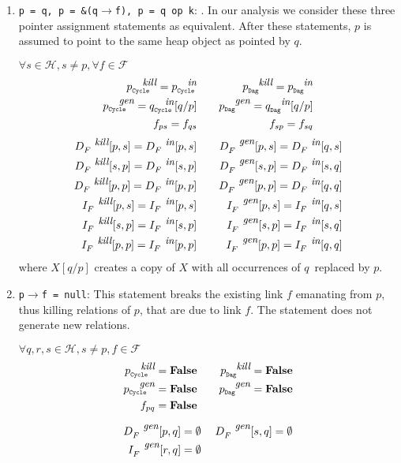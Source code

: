 \documentclass[runningheads,a4paper]{llncs}
\newcommand{\p}{\ensuremath{p}}
\newcommand{\q}{\ensuremath{q}}
\newcommand{\s}{\ensuremath{s}}
\newcommand{\myr}{\ensuremath{r}}
\newcommand{\heap}{\ensuremath{\mathcal{H}}}
\newcommand{\fields}{\ensuremath{\mathcal{F}}}
\newcommand{\subC}{\mbox{\scalebox{.6}{\Cycle}}}
\newcommand{\subD}{\mbox{\scalebox{.6}{\Dag}}}
\newcommand{\din}{\mbox{\footnotesize\em in}}
\newcommand{\dkill}{\mbox{\footnotesize\em kill}}
\newcommand{\dgen}{\mbox{\footnotesize\em gen}}
\newcommand{\GenC}[1]{\ensuremath{{#1}_{\subC}^{\dgen}}}
\newcommand{\GenD}[1]{\ensuremath{{#1}_{\subD}^{\dgen}}}
\newcommand{\KillC}[1]{\ensuremath{{#1}_{\subC}^{\dkill}}}
\newcommand{\KillD}[1]{\ensuremath{{#1}_{\subD}^{\dkill}}}
\newcommand{\InC}[1]{\ensuremath{{#1}_{\subC}^{\din}}}
\newcommand{\InD}[1]{\ensuremath{{#1}_{\subD}^{\din}}}
\newcommand{\Dag}{{\tt Dag}}
\newcommand{\Cycle}{{\tt Cycle}}
\newcommand{\false}{\textbf{False}}
\begin{document}
\begin{enumerate}
\item{\tt p = q, p = \&(q$\rightarrow$f), p = q op k}: . In our analysis
  we consider these three pointer assignment statements as
  equivalent. After these statements, $\p$ is assumed to
  point to the same heap object as pointed by $\q$.

$\forall \s \in \heap, \s \not= \p, \forall f \in \fields$
\begin{eqnarray*}
  \KillC{p} = \InC{p} &\quad& \KillD{p} = \InD{p} \\ 
  \GenC{p}   = \InC{q}[q/p]
  &\quad& \GenD{p} = \InD{q}[q/p] \\ 
  f_{\p\s} = f_{\q\s} &  \quad & f_{\s\p} = f_{\s\q}
\end{eqnarray*}
\begin{eqnarray*}
  D_F^{\dkill}[\p,\s]  =  D_F^{\din}[\p,\s] &\quad&
  D_F^{\dgen}[\p,\s]    =  D_F^{\din}[\q,\s]   \\ 
  D_F^{\dkill}[\s,\p]  =  D_F^{\din}[\s,\p] &\quad&
  D_F^{\dgen}[\s,\p]    =  D_F^{\din}[\s,\q]   \\
  D_F^{\dkill}[\p,\p]  =  D_F^{\din}[\p,\p] &\quad&
  D_F^{\dgen}[\p,\p]    =  D_F^{\din}[\q,\q]  \rule{0mm}{0pt}\\
  I_F^{\dkill}[\p,\s]  =  I_F^{\din}[\p,\s] &\quad&
  I_F^{\dgen}[\p,\s]    =   I_F^{\din}[\q,\s] \\
  I_F^{\dkill}[\s,\p]  =  I_F^{\din}[\s,\p] &\quad&
  I_F^{\dgen}[\s,\p]    =  I_F^{\din}[\s,\q]  \\
  I_F^{\dkill}[\p,\p]  =  I_F^{\din}[\p,\p] &\quad&
  I_F^{\dgen}[\p,\p]    = I_F^{\din}[\q,\q]
  \rule{0mm}{0pt}
\end{eqnarray*}
{where $X[\q/\p]$ creates a copy of $X$ with all occurrences
  of \q\ replaced by \p.}

\item {\tt p$\rightarrow$f = null}:
This statement breaks the existing link $f$ emanating from
$\p$, thus killing relations of \p, that are due to link
$f$. The statement does not generate new relations.

$\forall \q,\myr,\s \in \heap, \s \not= \p, f \in \fields$
\begin{eqnarray*}
  \KillC{p}  = \false &\quad& \KillD{p} = \false \\
  \GenC{p} = \false &\quad& \GenD{p} = \false \\
  f_{\p\q} = \false
\end{eqnarray*}

\begin{eqnarray*}
 	D_F^{\dgen}[\p,\q]    =  \emptyset &\;& D_F^{\dgen}[\s,\q]  = \emptyset \\		
	I_F^{\dgen}[\myr,\q]  =  \emptyset &\;& \\
	\rule{0mm}{0pt}
\end{eqnarray*}


\end{enumerate}
\end{document}

